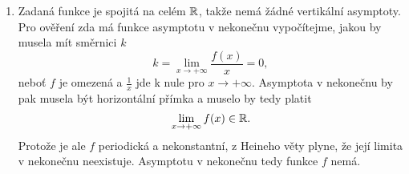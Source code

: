 \documentclass[answers]{exam}
\begin{document}
\begin{questions}
\begin{solution}
\begin{enumerate}
    		\item Zadaná funkce je spojitá na celém $\mathbb{R}$, takže nemá žádné vertikální asymptoty. Pro ověření zda má funkce asymptotu v nekonečnu vypočítejme, jakou by musela mít směrnici $k$
    		\begin{equation*}
    			k 
    			= 
    			\lim_{x \to +\infty} \frac{f(x)}{x}
    			=
    			0,
    		\end{equation*}
    		neboť $f$ je omezená a $\frac{1}{x}$ jde k nule pro $x \to +\infty$.
    		Asymptota v nekonečnu by pak musela být horizontální přímka a muselo by tedy platit
    		\begin{equation*}
					\lim_{x \to +\infty} f(x) \in \mathbb{R}.
    		\end{equation*}
    		Protože je ale $f$ periodická a nekonstantní, z Heineho věty plyne, že její limita v nekonečnu neexistuje. Asymptotu v nekonečnu tedy funkce $f$ nemá.
    		

\end{enumerate}
\end{solution}
\end{questions}
\end{document}
